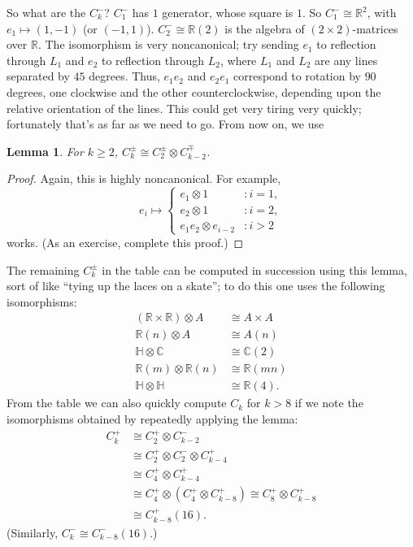 \documentclass{article}
\newcommand{\C}{\mathbb{C}}
\newcommand{\R}{\mathbb{R}}
\renewcommand{\mapsto}{\longmapsto}
\newtheorem{lem}[thm]{Lemma}
\theoremstyle{definition}
\begin{document}
  So what are the $C_k^-$?  $C_1^-$ has $1$ generator, whose square is $1$.  So $C_1^- \cong \R^2$, with $e_1 \mapsto (1, -1)$ (or $(-1, 1)$).  $C_2^- \cong \R(2)$ is the algebra of $(2 \times 2)$-matrices over $\R$.  The isomorphism is very noncanonical; try sending %
$e_1$ to reflection through $L_1$ and $e_2$ to reflection through $L_2$, where $L_1$ and $L_2$ are any lines separated by $45$ degrees.  Thus, $e_1e_2$ and $e_2e_1$ correspond to rotation by $90$ degrees, one clockwise and the other counterclockwise, depending upon the relative orientation of the lines.  This could get very tiring very quickly; fortunately that's as far as we need to go.  From now on, we use
\begin{lem}
For $k \ge 2$, $C_k^\pm \cong C_2^\pm \otimes C_{k-2}^\mp$.
\end{lem}
\begin{proof}
Again, this is highly noncanonical.  For example,
\[
e_i \mapsto
\begin{cases}
e_1 \otimes 1 & : i = 1, \\
e_2 \otimes 1 & : i = 2, \\
e_1e_2 \otimes e_{i-2} &: i > 2
\end{cases}
\]
works.  (As an exercise, complete this proof.)
\end{proof}

The remaining $C_k^\pm$ in the table can be computed in succession using this lemma, sort of like ``tying up the laces on a skate''; to do this one uses the following isomorphisms:
\begin{align*}
(\R \times \R) \otimes A & \cong A \times A \\
\R(n) \otimes A & \cong A(n) \\
\mathbb{H} \otimes \C & \cong \C(2) \\
\R(m) \otimes \R(n) & \cong \R(mn) \\
\mathbb{H} \otimes \mathbb{H} & \cong \R(4).
\end{align*}
From the table we can also quickly compute $C_k$ for $k > 8$ if we note the isomorphisms obtained by repeatedly applying the lemma:
\begin{align*}
C_k^+ & \cong C_2^+ \otimes C_{k-2}^- \\
& \cong C_2^+ \otimes C_2^- \otimes C^+_{k-4} \\
& \cong C_4^+ \otimes C_{k-4}^+ \\
& \cong C_4^+ \otimes (C_4^+ \otimes C_{k-8}^+) \cong C_8^+ \otimes C_{k-8}^+ \\
& \cong C_{k-8}^+(16).
\end{align*}
(Similarly, $C_k^- \cong C_{k-8}^-(16)$.)
\end{document}

